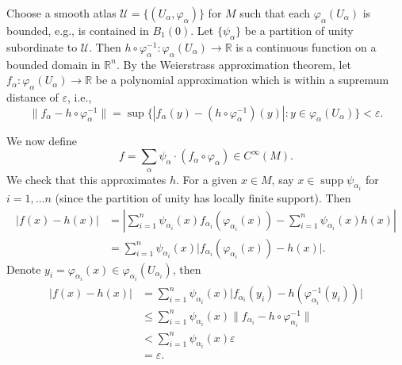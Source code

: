 \documentclass[12pt]{article}
\theoremstyle{definition}
\newcommand{\R}{\mathbb{R}}
\newcommand{\eps}{\varepsilon}
\renewcommand{\phi}{\varphi}
\newcommand{\<}{\langle}
\renewcommand{\>}{\rangle}
\DeclareMathOperator{\supp}{supp}
\newcommand{\UU}{\mathcal{U}}
\begin{document}
Choose a smooth atlas $\UU = \{(U_\alpha, \phi_\alpha)\}$ for $M$ such that each $\phi_\alpha(U_\alpha)$ is bounded, e.g., is contained in $B_1(0)$.
Let $\{\psi_\alpha\}$ be a partition of unity subordinate to $\UU$.
Then $h \circ \phi_\alpha^{-1} : \phi_\alpha(U_\alpha) \to \R$ is a continuous function on a bounded domain in $\R^n$.
By the Weierstrass approximation theorem, let $f_\alpha : \phi_\alpha(U_\alpha) \to \R$ be a polynomial approximation which is within a supremum distance of $\eps$, i.e.,
\[
    \|f_\alpha - h \circ \phi_\alpha^{-1}\|
        = \sup\{|f_\alpha(y) - (h \circ \phi_\alpha^{-1})(y)| : y \in \phi_\alpha(U_\alpha)\}
        < \eps.
\]

We now define
\[
    f
        = \sum_\alpha \psi_\alpha \cdot (f_\alpha \circ \phi_\alpha)
        \in C^\infty(M).
\]
We check that this approximates $h$.
For a given $x \in M$, say $x \in \supp\psi_{\alpha_i}$ for $i = 1, \dots n$ (since the partition of unity has locally finite support).
Then
\begin{align*}
    |f(x) - h(x)|
        &= \left|\sum_{i=1}^{n} \psi_{\alpha_i}(x)f_{\alpha_i}(\phi_{\alpha_i}(x)) - \sum_{i=1}^{n} \psi_{\alpha_i}(x)h(x)\right| \\
        &= \sum_{i=1}^{n} \psi_{\alpha_i}(x)\big|f_{\alpha_i}(\phi_{\alpha_i}(x)) - h(x)\big|. 
\end{align*}
Denote $y_i = \phi_{\alpha_i}(x) \in \phi_{\alpha_i}(U_{\alpha_i})$, then
\begin{align*}
    |f(x) - h(x)|
        &= \sum_{i=1}^{n} \psi_{\alpha_i}(x)\big|f_{\alpha_i}(y_i) - h(\phi_{\alpha_i}^{-1}(y_i))\big| \\
        &\leq \sum_{i=1}^{n} \psi_{\alpha_i}(x)\big\|f_{\alpha_i} - h \circ \phi_{\alpha_i}^{-1}\big\| \\
        &< \sum_{i=1}^{n} \psi_{\alpha_i}(x) \eps \\
        &= \eps.
\end{align*}
\end{document}
